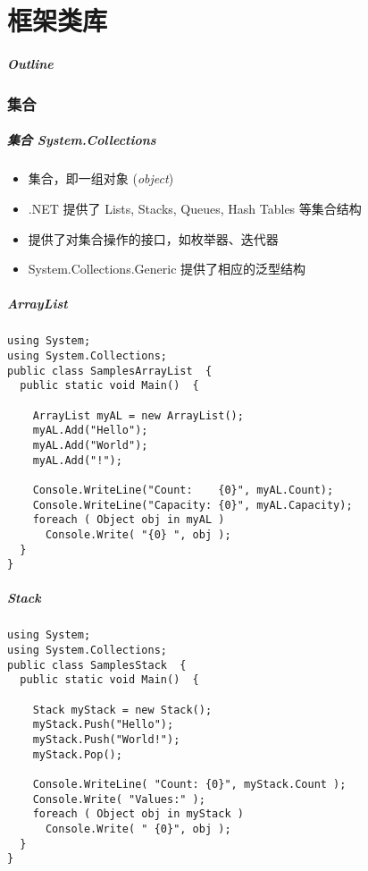 
\part{框架类库}
\begin{frame}
\frametitle{Outline}            %
\tableofcontents
\end{frame}

\section{集合}

\begin{frame}
\frametitle{集合 System.Collections}

\begin{itemize}
\setlength{\itemsep}{8pt plus 1pt}
\item 集合，即一组对象 (\textit{object})
\item .NET 提供了 Lists, Stacks, Queues, Hash Tables 等集合结构
\item 提供了对集合操作的接口，如枚举器、迭代器
\item System.Collections.Generic 提供了相应的泛型结构
\end{itemize}

\end{frame}

\begin{frame}[fragile]
\frametitle{ArrayList}
\begin{lstlisting}
using System;
using System.Collections;
public class SamplesArrayList  {
  public static void Main()  {

    ArrayList myAL = new ArrayList();
    myAL.Add("Hello");
    myAL.Add("World");
    myAL.Add("!");

    Console.WriteLine("Count:    {0}", myAL.Count);
    Console.WriteLine("Capacity: {0}", myAL.Capacity);
    foreach ( Object obj in myAL )
      Console.Write( "{0} ", obj );
  }
}
\end{lstlisting}
\end{frame}

\begin{frame}[fragile]
\frametitle{Stack}
\begin{lstlisting}
using System;
using System.Collections;
public class SamplesStack  {
  public static void Main()  {

    Stack myStack = new Stack();
    myStack.Push("Hello");
    myStack.Push("World!");
    myStack.Pop();

    Console.WriteLine( "Count: {0}", myStack.Count );
    Console.Write( "Values:" );
    foreach ( Object obj in myStack )
      Console.Write( " {0}", obj );
  }
}
\end{lstlisting}
\end{frame}

